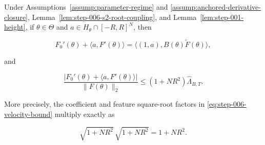 \begin{proposition}
\label{prop:step-006-s2-affine-velocity}

Under Assumptions~\ref{assump:parameter-regime} and
\ref{assump:anchored-derivative-closure}, Lemma~\ref{lem:step-006-s2-root-coupling}, and
Lemma~\ref{lem:step-001-height}, if \(\theta\in\Theta\) and
\(a\in H_\theta\cap[-R,R]^N\), then

\begin{equation}
F_0'(\theta)+\langle a,F'(\theta)\rangle
=\langle(1,a),B(\theta)\widetilde F(\theta)\rangle,
\label{eq:step-006-derivative-identity}
\end{equation}

and

\begin{equation}
\frac{\lvert F_0'(\theta)+\langle a,F'(\theta)\rangle\rvert}
{\lVert F(\theta)\rVert_2}
\leq(1+NR^2)\widehat\Lambda_{B,T}.
\label{eq:step-006-velocity-bound}
\end{equation}

More precisely, the coefficient and feature square-root factors in
\eqref{eq:step-006-velocity-bound} multiply exactly as

\begin{equation}
\sqrt{1+NR^2}\,\sqrt{1+NR^2}=1+NR^2.
\label{eq:step-006-factor-product}
\end{equation}


\end{proposition}

